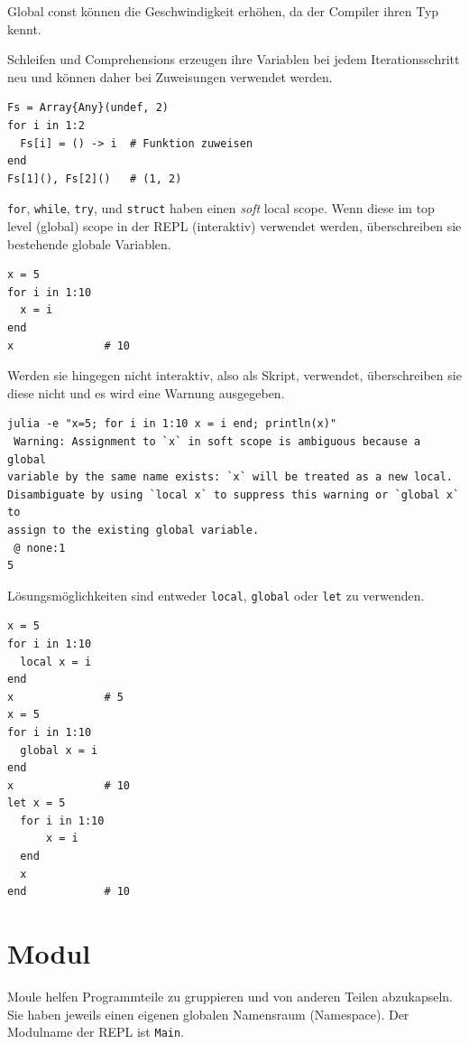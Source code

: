 \documentclass[10pt,twocolumn]{scrartcl}
\begin{document}
Global const können die Geschwindigkeit erhöhen, da der Compiler ihren Typ
kennt.

Schleifen und Comprehensions erzeugen ihre Variablen bei jedem Iterationsschritt
neu und können daher bei Zuweisungen verwendet werden.

\begin{lstlisting}
Fs = Array{Any}(undef, 2)
for i in 1:2
  Fs[i] = () -> i  # Funktion zuweisen
end
Fs[1](), Fs[2]()   # (1, 2)
\end{lstlisting}

\lstinline|for|, \lstinline|while|, \lstinline|try|, und \lstinline|struct|
haben einen \emph{soft} local scope. Wenn diese im top level (global) scope in
der REPL (interaktiv) verwendet werden, überschreiben sie bestehende globale
Variablen.

\begin{lstlisting}
x = 5
for i in 1:10
  x = i
end
x              # 10
\end{lstlisting}

Werden sie hingegen nicht interaktiv, also als Skript, verwendet,
überschreiben sie diese nicht und es wird eine Warnung ausgegeben.

\begin{lstlisting}
julia -e "x=5; for i in 1:10 x = i end; println(x)"
 Warning: Assignment to `x` in soft scope is ambiguous because a global 
variable by the same name exists: `x` will be treated as a new local. 
Disambiguate by using `local x` to suppress this warning or `global x` to 
assign to the existing global variable.
 @ none:1
5
\end{lstlisting}

Lösungsmöglichkeiten sind entweder \lstinline|local|, \lstinline|global| oder
\lstinline|let| zu verwenden.

\begin{lstlisting}
x = 5
for i in 1:10
  local x = i
end
x              # 5
x = 5
for i in 1:10
  global x = i
end
x              # 10
let x = 5
  for i in 1:10
      x = i
  end
  x
end            # 10
\end{lstlisting}
  
\section{Modul}
\label{sec:modul}

Moule helfen Programmteile zu gruppieren und von anderen Teilen abzukapseln. Sie
haben jeweils einen eigenen globalen Namensraum (Namespace). Der Modulname der
REPL ist \lstinline|Main|.
\end{document}
